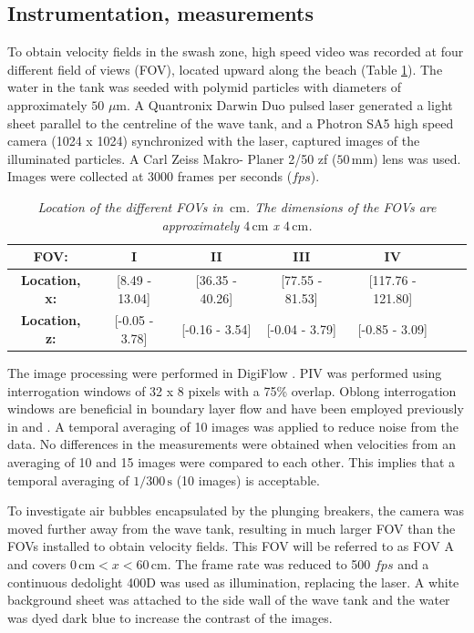\documentclass[review, authoryear]{elsarticle}
\newcommand{\s}{\,\mbox{s}}
\newcommand{\cm}{\,\mbox{cm}}
\newcommand{\mm}{\,\mbox{mm}}
\begin{document}
\subsection{Instrumentation, measurements}
\label{ins_measure}
To obtain velocity fields in the swash zone, high speed video was recorded at four different field of views (FOV), located upward along the beach (Table \ref{tab:loc}).  The water in the tank was seeded with polymid particles with diameters of approximately $50$ $\mu$m. A Quantronix Darwin Duo pulsed laser generated a light sheet parallel to the centreline of the wave tank, and a Photron SA5 high speed camera (1024 x 1024) synchronized with the laser, captured images of the illuminated particles. A Carl Zeiss Makro- Planer 2/50 zf ($50\mm$) lens was used. Images were collected at 3000 frames per seconds ($fps$).
 \begin{table}[]
 \centering
\caption{\textit{Location of the different FOVs  in $\cm$. The dimensions of the FOVs are approximately $4\cm$ x $4\cm$.}}
\begin{tabular}{|c|c|c|c|c|c|c|}
\hline
\textbf{FOV:}      & I                   & II                 & III     & IV \\ \hline
\textbf{Location, x:}& {[}8.49 - 13.04{]} & {[}36.35 - 40.26{]} & {[}77.55 - 81.53{]} & {[}117.76 - 121.80{]} 
 \\ \hline
\textbf{Location, z:}&  {[}-0.05 - 3.78{]} & {[}-0.16 - 3.54{]} & {[}-0.04 - 3.79{]} & {[}-0.85 - 3.09{]} 
\\ \hline
\end{tabular}
\label{tab:loc}
\end{table}
The image processing were performed in DigiFlow \citep{digiflow}. PIV was performed using interrogation windows of 32 x 8 pixels with a 75\% overlap. Oblong interrogation windows are beneficial in boundary layer flow and have been employed previously in \cite{liu2007boundary} and \cite{pedersen2013runup}. A temporal averaging of 10 images was applied to reduce noise from the data. No differences in the measurements were obtained when velocities from an averaging of 10 and 15 images were compared to each other. This implies that a temporal averaging of $1/300 \s$ (10 images) is acceptable.

To investigate air bubbles encapsulated by the plunging breakers, the camera was moved further away from the wave tank, resulting in much larger FOV than the FOVs installed to obtain velocity fields. This FOV will be referred to as FOV A and covers $0\cm< x <60\cm$. The frame rate was reduced to  500 $fps$  
and a continuous dedolight 400D was used as illumination, replacing the laser. A white background sheet was attached to the side wall of the wave tank and the water was dyed dark blue to increase the contrast of the images.
\end{document}

